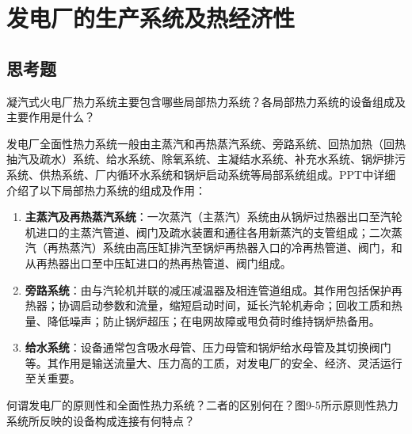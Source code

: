 \chapter{发电厂的生产系统及热经济性}

\section{思考题}

\begin{problem}
凝汽式火电厂热力系统主要包含哪些局部热力系统？各局部热力系统的设备组成及主要作用是什么？
\end{problem}

\begin{solution}
发电厂全面性热力系统一般由主蒸汽和再热蒸汽系统、旁路系统、回热加热（回热抽汽及疏水）系统、给水系统、除氧系统、主凝结水系统、补充水系统、锅炉排污系统、供热系统、厂内循环水系统和锅炉启动系统等局部系统组成。PPT中详细介绍了以下局部热力系统的组成及作用：

\begin{enumerate}
  \item \textbf{主蒸汽及再热蒸汽系统}：一次蒸汽（主蒸汽）系统由从锅炉过热器出口至汽轮机进口的主蒸汽管道、阀门及疏水装置和通往各用新蒸汽的支管组成；二次蒸汽（再热蒸汽）系统由高压缸排汽至锅炉再热器入口的冷再热管道、阀门，和从再热器出口至中压缸进口的热再热管道、阀门组成。
  \item \textbf{旁路系统}：由与汽轮机并联的减压减温器及相连管道组成。其作用包括保护再热器；协调启动参数和流量，缩短启动时间，延长汽轮机寿命；回收工质和热量、降低噪声；防止锅炉超压；在电网故障或甩负荷时维持锅炉热备用。
  \item \textbf{给水系统}：设备通常包含吸水母管、压力母管和锅炉给水母管及其切换阀门等。其作用是输送流量大、压力高的工质，对发电厂的安全、经济、灵活运行至关重要。
\end{enumerate}
\end{solution}

\begin{problem}
何谓发电厂的原则性和全面性热力系统？二者的区别何在？图9-5所示原则性热力系统所反映的设备构成连接有何特点？
\end{problem}

